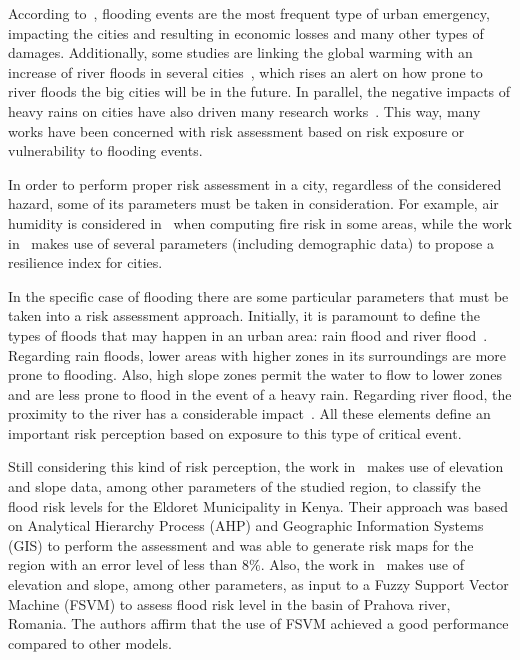 \begin{refsection}
According to~\cite{flood}, flooding events are the most frequent type of urban emergency, impacting the cities and resulting in economic losses and many other types of damages. Additionally, some studies are linking the global warming with an increase of river floods in several cities~\cite{warming,warming_bangladesh}, which rises an alert on how prone to river floods the big cities will be in the future. In parallel, the negative impacts of heavy rains on cities have also driven many research works~\cite{heavyrain1,heavyrain2}. This way, many works have been concerned with risk assessment based on risk exposure or vulnerability to flooding events.

In order to perform proper risk assessment in a city, regardless of the considered hazard, some of its parameters must be taken in consideration. For example, air humidity is considered in~\cite{fire1} when computing fire risk in some areas, while the work in~\cite{redi} makes use of several parameters (including demographic data) to propose a resilience index for cities. 

In the specific case of flooding there are some particular parameters that must be taken into a risk assessment approach. Initially, it is paramount to define the types of floods that may happen in an urban area: rain flood and river flood~\cite{elevation1}. Regarding rain floods, lower areas with higher zones in its surroundings are more prone to flooding. Also, high slope zones permit the water to flow to lower zones and are less prone to flood in the event of a heavy rain. Regarding river flood, the proximity to the river has a considerable impact~\cite{chapi2017novel}. All these elements define an important risk perception based on exposure to this type of critical event.

Still considering this kind of risk perception, the work in~\cite{elevation1} makes use of elevation and slope data, among other parameters of the studied region, to classify the flood risk levels for the Eldoret Municipality in Kenya. Their approach was based on Analytical Hierarchy Process (AHP) and Geographic Information Systems (GIS) to perform the assessment and was able to generate risk maps for the region with an error level of less than 8\%. Also, the work in~\cite{elevation2} makes use of elevation and slope, among other parameters, as input to a Fuzzy Support Vector Machine (FSVM) to assess flood risk level in the basin of Prahova river, Romania. The authors affirm that the use of FSVM achieved a good performance compared to other models.


\end{refsection}
